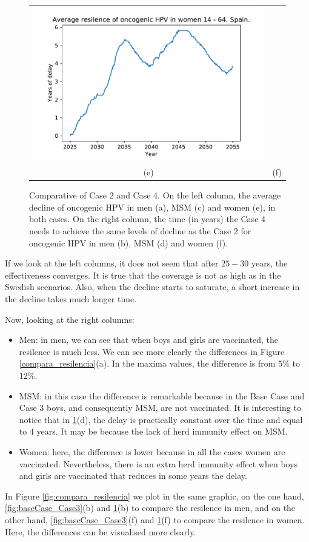 \begin{figure}[!]
\begin{tabular}{cc}
		\includegraphics[width=0.5\linewidth]{IMGs/11.-Resilencia/2_y_4/resilencia_onco_muj.pdf}  \\ 
		(e)	& (f) \\  
	\end{tabular} 
	\caption{Comparative of Case 2 and Case 4. On the left column, the average decline of oncogenic HPV in men (a), MSM (c) and women (e), in both cases. On the right column, the time (in years) the Case 4 needs to achieve the same levels of decline as the Case 2 for oncogenic HPV in men (b), MSM (d) and women (f).}
	\label{fig:Case2_Case4}
\end{figure}

If we look at the left columns, it does not seem that after $25-30$ years, the effectiveness converges. It is true that the coverage is not as high as in the Swedish scenarios. Also, when the decline starts to saturate, a short increase in the decline takes much longer time.

Now, looking at the right columns:

\begin{itemize}
\item Men: in men, we can see that when boys and girls are vaccinated, the resilence is much less. We can see more clearly the differences in Figure \ref{compara_resilencia}(a). In the maxima values, the difference is from $5\%$ to $12\%$.
\item MSM: in this case the difference is remarkable because in the Base Case and Case 3 boys, and consequently MSM, are not vaccinated. It is interesting to notice that in \ref{fig:Case2_Case4}(d), the delay is practically constant over the time and equal to $4$ years. It may be because the lack of herd immunity effect on MSM.
\item Women: here, the difference is lower because in all the cases women are vaccinated. Nevertheless, there is an extra herd immunity effect when boys and girls are vaccinated that reduces in some years the delay.
\end{itemize}

In Figure \ref{fig:compara_resilencia} we plot in the same graphic, on the one hand,  \ref{fig:baseCase_Case3}(b) and \ref{fig:Case2_Case4}(b) to compare the resilence in men, and on the other hand, \ref{fig:baseCase_Case3}(f) and \ref{fig:Case2_Case4}(f) to compare the resilence in women. Here, the differences can be visualised more clearly.

